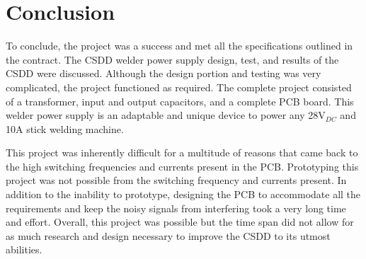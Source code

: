 \documentclass[11pt]{article}
\begin{document}
\section{Conclusion}
    
    To conclude, the project was a success and met all the specifications outlined in the contract. The CSDD welder power supply design, test, and results of the CSDD were discussed. Although the design portion and testing was very complicated, the project functioned as required. The complete project consisted of a transformer, input and output capacitors, and a complete PCB board. This welder power supply is an adaptable and unique device to power any 28V$_{DC}$ and 10A stick welding machine. 
    
    This project was inherently difficult for a multitude of reasons that came back to the high switching frequencies and currents present in the PCB. Prototyping this project was not possible from the switching frequency and currents present. In addition to the inability to prototype, designing the PCB to accommodate all the requirements and keep the noisy signals from interfering took a very long time and effort. Overall, this project was possible but the time span did not allow for as much research and design necessary to improve the CSDD to its utmost abilities. 

\newpage

\printbibliography

\newpage
\appendix
\appendixpage
\addapptotoc
\begin{minipage}[t]{0.7\linewidth}
  
\end{minipage}












\end{document}
